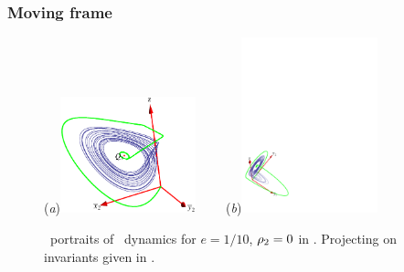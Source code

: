 \subsubsection{Moving frame}
\label{sec:CLeMF}


\begin{figure}[ht]
\begin{center}
  (\textit{a})\includegraphics[width=0.35\textwidth]{../figs/CLEmfXYZ}
~~~~(\textit{b})\includegraphics[width=0.35\textwidth]{../figs/CLEmfYYZ}
\end{center}
\caption[Orbit space projection of Complex Lorenz flow: Moving frame]{ \Statesp\
portraits of \CLe\ dynamics for $e=1/10$, $\rho_2=0$
in \reducedsp. Projecting on invariants given in .
    }
\label{fig:CLEmf}
\end{figure}

